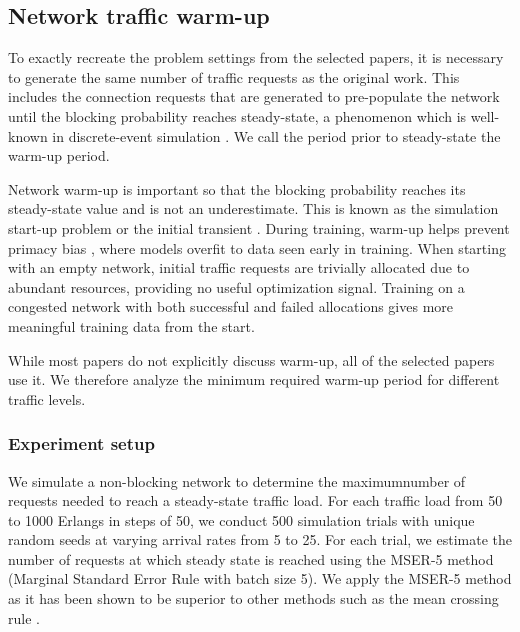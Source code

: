 
\subsection{Network traffic warm-up}
\label{sec:warmup}

To exactly recreate the problem settings from the selected papers, it is necessary to generate the same number of traffic requests as the original work. This includes the connection requests that are generated to pre-populate the network until the blocking probability reaches steady-state, a phenomenon which is well-known in discrete-event simulation \cite{banks_discrete-event_2005}. We call the period prior to steady-state the warm-up period. 

Network warm-up is important so that the blocking probability reaches its steady-state value and is not an underestimate. This is known as the simulation start-up problem or the initial transient \cite{white_problem_2009}. During training, warm-up helps prevent primacy bias \cite{nikishin_primacy_2022}, where models overfit to data seen early in training. When starting with an empty network, initial traffic requests are trivially allocated due to abundant resources, providing no useful optimization signal. Training on a congested network with both successful and failed allocations gives more meaningful training data from the start.

While most papers do not explicitly discuss warm-up, all of the selected papers use it. We therefore analyze the minimum required warm-up period for different traffic levels.

\subsubsection{Experiment setup}

We simulate a non-blocking network to determine the maximum\footnotemark number of requests needed to reach a steady-state traffic load. For each traffic load from 50 to 1000 Erlangs in steps of 50, we conduct 500 simulation trials with unique random seeds at varying arrival rates from 5 to 25.  For each trial, we estimate the number of requests at which steady state is reached using the MSER-5 method \cite{franklin_stationarity_2008} (Marginal Standard Error Rule with batch size 5). We apply the MSER-5 method as it has been shown to be superior to other methods such as the mean crossing rule \cite{white_problem_2009}.




